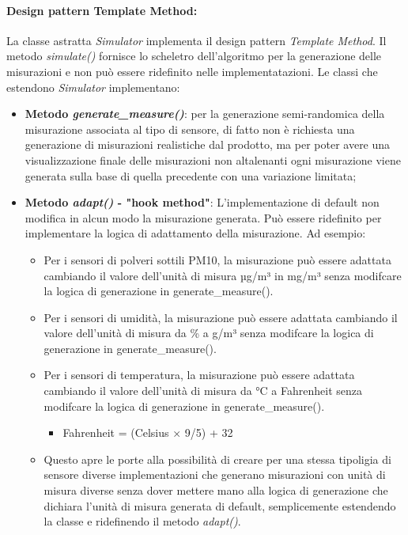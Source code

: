 \paragraph{Design pattern Template Method:} \label{sec:templateSIM}

La classe astratta \textit{Simulator} implementa il design pattern \textit{Template Method}. Il metodo \textit{simulate()} fornisce lo scheletro dell'algoritmo per la generazione delle misurazioni e non può essere ridefinito nelle implementatazioni. Le classi che estendono \textit{Simulator} implementano:
\begin{itemize}
    \item \textbf{Metodo \textit{generate\_measure()}}: per la generazione semi-randomica della misurazione associata al tipo di sensore, di fatto non è richiesta una generazione di misurazioni realistiche dal prodotto, ma per poter avere una visualizzazione finale delle misurazioni non altalenanti ogni misurazione viene generata sulla base di quella precedente con una variazione limitata;
    \item \textbf{Metodo \textit{adapt()} - "hook method"}: L'implementazione di default non modifica in alcun modo la misurazione generata. Può essere ridefinito per implementare la logica di adattamento della misurazione.
    Ad esempio:
    \begin{itemize}
        \item Per i sensori di polveri sottili PM10, la misurazione può essere adattata cambiando il valore dell'unità di misura µg/m³ in mg/m³ senza modifcare la logica di generazione in generate\_measure().
        \item Per i sensori di umidità, la misurazione può essere adattata cambiando il valore dell'unità di misura da \% a g/m³ senza modifcare la logica di generazione in generate\_measure().
        \item Per i sensori di temperatura, la misurazione può essere adattata cambiando il valore dell'unità di misura da °C a Fahrenheit  senza modifcare la logica di generazione in generate\_measure().
        \begin{itemize}
            \item Fahrenheit = (Celsius × 9/5) + 32
        \end{itemize}
        \item Questo apre le porte alla possibilità di creare per una stessa tipoligia di sensore diverse implementazioni che generano misurazioni con unità di misura diverse senza dover mettere mano alla logica di generazione che dichiara l'unità di misura generata di default, semplicemente estendendo la classe e ridefinendo il metodo \textit{adapt()}.
        

\end{itemize}
\end{itemize}
